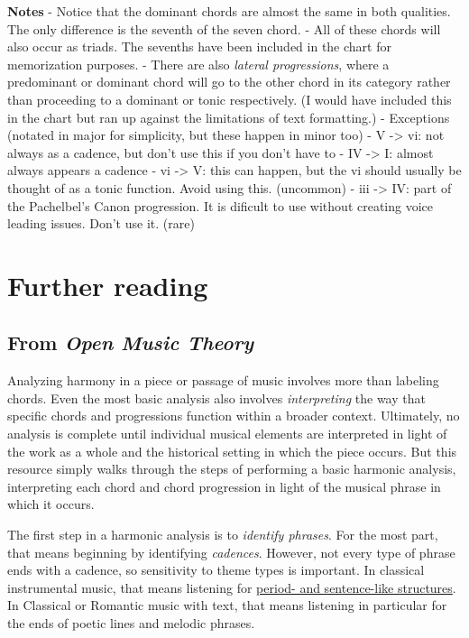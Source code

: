 \documentclass{book}
\begin{document}
\textbf{Notes} - Notice that the dominant chords are almost the same in both
qualities. The only difference is the seventh of the seven chord. - All of
these chords will also occur as triads. The sevenths have been included in the
chart for memorization purposes. - There are also \emph{lateral progressions},
where a predominant or dominant chord will go to the other chord in its
category rather than proceeding to a dominant or tonic respectively. (I would
have included this in the chart but ran up against the limitations of text
formatting.) - Exceptions (notated in major for simplicity, but these happen
in minor too) - V -\textgreater{} vi: not always as a cadence, but don't use
this if you don't have to - IV -\textgreater{} I: almost always appears a
cadence - vi -\textgreater{} V: this can happen, but the vi should usually be
thought of as a tonic function. Avoid using this. (uncommon) - iii
-\textgreater{} IV: part of the Pachelbel's Canon progression. It is dificult
to use without creating voice leading issues. Don't use it. (rare)

\hypertarget{further-reading-1}{%
\chapter{Further reading}\label{further-reading-1}}

\hypertarget{from-open-music-theory-2}{%
\section{\texorpdfstring{From \emph{Open Music
Theory}}{From Open Music Theory}}\label{from-open-music-theory-2}}

Analyzing harmony in a piece or passage of music involves more than labeling
chords. Even the most basic analysis also involves \emph{interpreting} the way
that specific chords and progressions function within a broader context.
Ultimately, no analysis is complete until individual musical elements are
interpreted in light of the work as a whole and the historical setting in
which the piece occurs. But this resource simply walks through the steps of
performing a basic harmonic analysis, interpreting each chord and chord
progression in light of the musical phrase in which it occurs.

The first step in a harmonic analysis is to \emph{identify phrases}. For the
most part, that means beginning by identifying \emph{cadences}. However, not
every type of phrase ends with a cadence, so sensitivity to theme types is
important. In classical instrumental music, that means listening for
\href{classicalThemes.html}{period- and sentence-like structures}. In
Classical or Romantic music with text, that means listening in particular for
the ends of poetic lines and melodic phrases.
\end{document}
